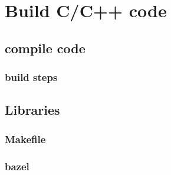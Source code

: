 \chapter{Build C/C++ code}

\section{compile code} 

\subsection{build steps} 

\section{Libraries} 


\subsection{Makefile} 

\subsection{bazel} 

